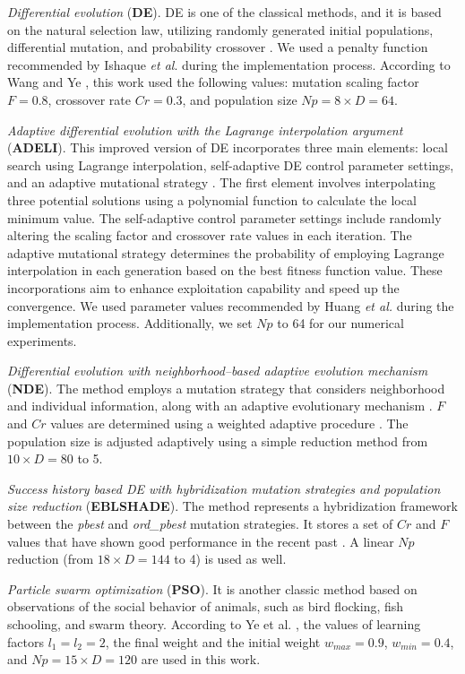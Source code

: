 \documentclass[a4paper,fleqn]{cas-sc}
\begin{document}
\emph{Differential evolution} (\textbf{DE}).
DE is one of the classical methods,
and  it is based on the natural selection law, utilizing randomly generated initial populations,
differential mutation, and probability crossover \cite{DEWang}.
We used a penalty function recommended by Ishaque \emph{et al}. \cite{P-DE_Ishaque} during the implementation process.
According to Wang and Ye \cite{DEWang}, this work used the following values:
mutation scaling factor $F=0.8$,
crossover rate $C\!r=0.3$,
and population size $N\!p=8\times D=64$.

\emph{Adaptive differential evolution with the Lagrange interpolation argument} (\textbf{ADELI}).
This improved version of DE incorporates three main elements:
local search using Lagrange interpolation, self-adaptive DE control parameter settings,
and an adaptive mutational strategy \cite{ADELI}.
The first element involves interpolating three potential solutions using a
polynomial function to calculate the local minimum value.
The self-adaptive control parameter settings include randomly altering the
scaling factor and crossover rate values in each iteration.
The adaptive mutational strategy determines the probability of
employing Lagrange interpolation in each generation based on the best fitness function value.
These incorporations aim to enhance exploitation capability and speed up the convergence.
We used parameter values recommended by Huang \emph{et al.} \cite{ADELI} during the implementation process.
Additionally, we set $N\!p$ to 64 for our numerical experiments.

\emph{Differential evolution with neighborhood--based adaptive evolution mechanism} (\textbf{NDE}).
The method employs a mutation strategy that considers neighborhood and individual information, along with an adaptive evolutionary mechanism \cite{NDE}.
$F$ and $C\!r$ values are determined using a weighted adaptive procedure \cite{Tanabe2014}.
The population size is adjusted adaptively using a simple reduction method from $10\times D=80$ to 5.

\emph{Success history based DE with hybridization mutation strategies and population size reduction} (\textbf{EBLSHADE}).
The method represents a hybridization framework between the \emph{pbest} and \emph{ord\_pbest} mutation strategies.
It stores a set of $Cr$ and $F$ values that have shown good performance in the recent past \cite{EBLSHADE}.
A linear $N\!p$ reduction (from $18\times D=144$ to 4) is used as well.

\emph{Particle swarm optimization} (\textbf{PSO}).
It is another classic method based on observations of the social behavior of animals,
such as bird flocking, fish schooling, and swarm theory.
According to Ye et al. \cite{PSO},  the values of learning factors $l_1=l_2=2$,
the final weight and the initial weight $w_{max}=0.9$, $w_{min}=0.4$, and
$N\!p=15\times D=120$ are used in this work.
\end{document}
